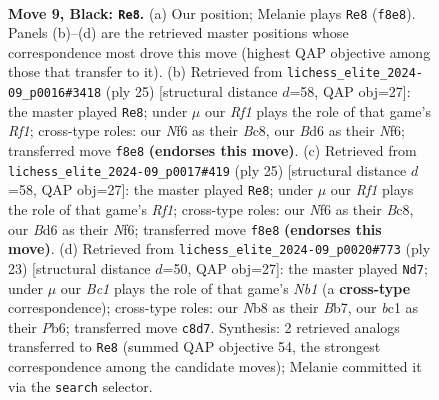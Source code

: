 \documentclass[11pt]{article}
\begin{document}
\clearpage

\begin{figure}[p]\centering
\begin{subfigure}{0.46\textwidth}\centering
\resizebox{\linewidth}{!}{%
\newchessgame
\chessboard[
  setfen={rnbq1rk1/pp4pp/2pbpn2/5p2/2PP4/2N2NP1/P3PPBP/R1BQ1RK1 b - - 2 9},
  showmover=false,
  pgfstyle=straightmove, color=movearrow, markmove={f8-e8}
]}
\caption{}
\end{subfigure}\hfill
\begin{subfigure}{0.46\textwidth}\centering
\resizebox{\linewidth}{!}{%
\newchessgame
\chessboard[
  setfen={rnbq1rk1/1p3pp1/p2b1n1p/2pP4/2P5/PPN2N2/4B1PP/R1BQ1RK1 b - - 0 13},
  showmover=false,
  pgfstyle=straightmove, color=movearrow, markmove={f8-e8}
]}
\caption{}
\end{subfigure}
\\[4pt]
\begin{subfigure}{0.46\textwidth}\centering
\resizebox{\linewidth}{!}{%
\newchessgame
\chessboard[
  setfen={rnbq1rk1/1p3pp1/p2b1n1p/2pP4/2P5/PPN2N2/4B1PP/R1BQ1RK1 b - - 0 13},
  showmover=false,
  pgfstyle=straightmove, color=movearrow, markmove={f8-e8}
]}
\caption{}
\end{subfigure}\hfill
\begin{subfigure}{0.46\textwidth}\centering
\resizebox{\linewidth}{!}{%
\newchessgame
\chessboard[
  setfen={rn1q1rk1/pb2bppp/1p2p3/3nP3/4N3/P2B1N2/1P3PPP/R1BQ1RK1 b - - 0 12},
  showmover=false,
  pgfstyle=straightmove, color=movearrow, markmove={b8-d7}
]}
\caption{}
\end{subfigure}
\caption{\textbf{Move 9, Black: \texttt{Re8}.} (a) Our position; Melanie plays \texttt{Re8} (\texttt{f8e8}). Panels (b)--(d) are the retrieved master positions whose correspondence most drove this move (highest QAP objective among those that transfer to it). (b) Retrieved from \texttt{lichess\_elite\_2024-09\_p0016\#3418} (ply 25) [structural distance $d$=58, QAP obj=27]: the master played \texttt{Re8}; under $\mu$ our \emph{Rf1} plays the role of that game's \emph{Rf1}; cross-type roles: our \emph{N}f6 as their \emph{B}c8, our \emph{B}d6 as their \emph{N}f6; transferred move \texttt{f8e8} \textbf{(endorses this move)}. (c) Retrieved from \texttt{lichess\_elite\_2024-09\_p0017\#419} (ply 25) [structural distance $d$=58, QAP obj=27]: the master played \texttt{Re8}; under $\mu$ our \emph{Rf1} plays the role of that game's \emph{Rf1}; cross-type roles: our \emph{N}f6 as their \emph{B}c8, our \emph{B}d6 as their \emph{N}f6; transferred move \texttt{f8e8} \textbf{(endorses this move)}. (d) Retrieved from \texttt{lichess\_elite\_2024-09\_p0020\#773} (ply 23) [structural distance $d$=50, QAP obj=27]: the master played \texttt{Nd7}; under $\mu$ our \emph{Bc1} plays the role of that game's \emph{Nb1} (a \textbf{cross-type} correspondence); cross-type roles: our \emph{N}b8 as their \emph{B}b7, our \emph{b}c1 as their \emph{P}b6; transferred move \texttt{c8d7}. Synthesis: 2 retrieved analogs transferred to \texttt{Re8} (summed QAP objective 54, the strongest correspondence among the candidate moves); Melanie committed it via the \texttt{search} selector.}
\label{fig:thought-m17}
\end{figure}
\end{document}
